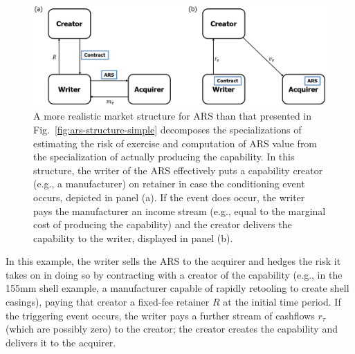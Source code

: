 \documentclass{article}
\begin{document}
\begin{figure}
    \centering
    \includegraphics[width=\linewidth]{ars-structure-complex.png}
    \caption{
    A more realistic market structure for ARS than that presented in Fig.\ \ref{fig:ars-structure-simple} decomposes the specializations of estimating the risk of exercise and computation of ARS value from the specialization of actually producing the capability.
    In this structure, the writer of the ARS effectively puts a capability creator (e.g., a manufacturer) on retainer in case the conditioning event occurs, depicted in panel (a). If the event does occur, the writer pays the manufacturer an income stream (e.g., equal to the marginal cost of producing the capability) and the creator delivers the capability to the writer, displayed in panel (b).
    }
    \label{fig:ars-structure-complex}
\end{figure}
In this example, the writer sells the ARS to the acquirer
and hedges the risk it takes on in doing so
by contracting with a creator of the capability (e.g., in the 155mm shell example, a manufacturer capable of rapidly retooling to create shell casings), paying that creator a fixed-fee retainer $R$ at the initial time period.
If the triggering event occurs, the writer pays a further stream of cashflows $r_\tau$ (which are possibly zero) to the creator; the creator creates the capability and delivers it to the acquirer.
\end{document}
